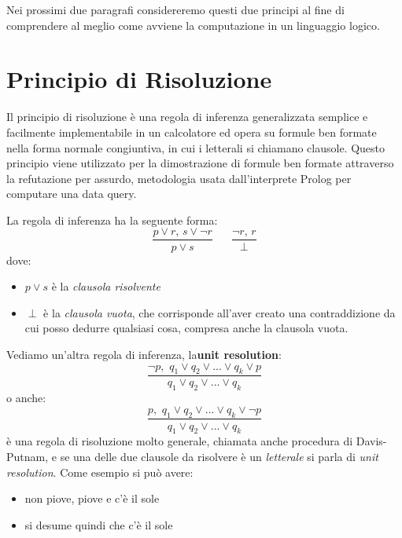 \documentclass[a4paper]{book}
\begin{document}
Nei prossimi due paragrafi considereremo questi due principi al fine di comprendere al meglio come avviene la computazione in un linguaggio logico.
\section{Principio di Risoluzione}
Il principio di risoluzione è una regola di inferenza generalizzata semplice e facilmente implementabile in un calcolatore
ed opera su formule ben formate nella forma normale congiuntiva, in cui i letterali si chiamano clausole.\newline
Questo principio viene utilizzato  per la dimostrazione di formule ben formate attraverso la refutazione per assurdo,
metodologia usata dall'interprete Prolog per computare una data query.

La regola di inferenza ha la seguente forma:
\begin{equation*}
  \frac{p\vee r,\, s\lor \neg r}{p\vee s}\,\,\,\,\,\,\,\,\,\,\frac{\neg r,\, r}{\perp}
\end{equation*}
dove:
\begin{itemize}
\item $p \lor  s$ è la \textit{clausola risolvente}
\item $\perp$ è la \textit{clausola vuota}, che corrisponde all'aver creato una contraddizione da cui posso dedurre qualsiasi cosa,
       compresa anche la clausola vuota.
\end{itemize}
Vediamo un'altra regola di inferenza, la\textbf{unit resolution}:
   \begin{equation*}
     \frac{\neg p,\,\, q_1\vee q_2\vee ... \vee q_k \vee p}{q_1\vee q_2\vee ... \vee q_k}
   \end{equation*}
o anche:
\begin{equation*}
  \frac{p,\,\, q_1\vee q_2\vee ... \vee q_k \vee \neg p}{q_1\vee q_2\vee ... \vee q_k}
\end{equation*}
è una regola di risoluzione molto generale, chiamata anche procedura di Davis-Putnam, e se una delle due clausole da risolvere
è un \textit{letterale} si parla di \emph{unit resolution}.\newline
Come esempio si può avere:
\begin{itemize}
\item non piove, piove e c'è il sole
\item si desume quindi che c'è il sole
\end{itemize}
\end{document}
